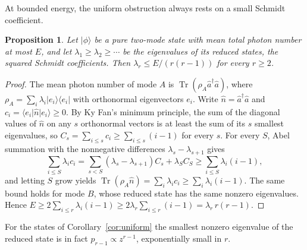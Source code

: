 \documentclass[11pt,a4paper]{article}
\newtheorem{proposition}[theorem]{Proposition}
\theoremstyle{definition}
\theoremstyle{plain}
\DeclareMathOperator{\Tr}{Tr}
\newcommand{\ket}[1]{\lvert#1\rangle}
\newcommand{\bra}[1]{\langle#1\rvert}
\newcommand{\ketbra}[2]{\lvert#1\rangle\langle#2\rvert}
\begin{document}
At bounded energy, the uniform obstruction always rests on a small Schmidt
coefficient.

\begin{proposition}\label{prop:markov}
Let $\ket\phi$ be a pure two-mode state with mean total photon number at most
$E$, and let $\lambda_1\ge\lambda_2\ge\cdots$ be the eigenvalues of its reduced
states, the squared Schmidt coefficients. Then $\lambda_r\le E/(r(r-1))$ for
every $r\ge2$.
\end{proposition}

\begin{proof}
The mean photon number of mode $A$ is $\Tr(\rho_A\hat a^\dagger\hat a)$, where
$\rho_A=\sum_i\lambda_i\ketbra{e_i}{e_i}$ with orthonormal eigenvectors $e_i$.
Write $\hat n=\hat a^\dagger\hat a$ and $c_i=\bra{e_i}\hat n\ket{e_i}\ge0$. By Ky
Fan's minimum principle, the sum of the diagonal values of $\hat n$ on any $s$
orthonormal vectors is at least the sum of its $s$ smallest eigenvalues, so
$C_s=\sum_{i\le s}c_i\ge\sum_{i\le s}(i-1)$ for every $s$. For every $S$, Abel
summation with the nonnegative differences $\lambda_s-\lambda_{s+1}$ gives
\[
\sum_{i\le S}\lambda_ic_i=\sum_{s<S}(\lambda_s-\lambda_{s+1})C_s+\lambda_SC_S
\ge\sum_{i\le S}\lambda_i(i-1),
\]
and letting $S$ grow yields $\Tr(\rho_A\hat n)=\sum_i\lambda_ic_i\ge\sum_i\lambda_i(i-1)$. The same bound holds for mode $B$, whose
reduced state has the same nonzero eigenvalues. Hence
$E\ge2\sum_{i\le r}\lambda_i(i-1)\ge2\lambda_r\sum_{i\le r}(i-1)=\lambda_r\,r(r-1)$.
\end{proof}

For the states of Corollary~\ref{cor:uniform} the smallest nonzero
eigenvalue of the reduced state is in fact $p_{r-1}\propto z^{r-1}$,
exponentially small in $r$.
\end{document}
